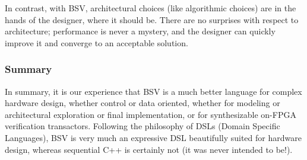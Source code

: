 In contrast, with BSV, architectural choices (like algorithmic
choices) are in the hands of the designer, where it should be.  There
are no surprises with respect to architecture; performance is never a
mystery, and the designer can quickly improve it and converge to an
acceptable solution.


\subsubsection{Summary}

In summary, it is our experience that BSV is a much better language
for complex hardware design, whether control or data oriented, whether
for modeling or architectural exploration or final implementation, or
for synthesizable on-FPGA verification transactors.  Following the
philosophy of DSLs (Domain Specific Languages), BSV is very much an
expressive DSL beautifully suited for hardware design, whereas
sequential C++ is certainly not (it was never intended to be!).

